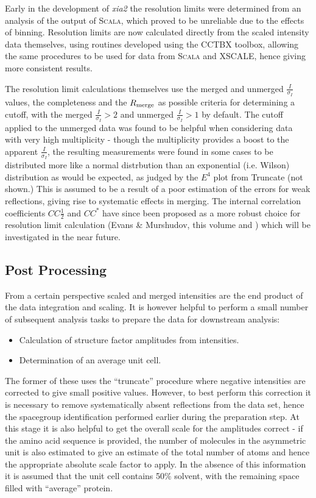 \documentclass[preprint,pdf]{iucr}
\begin{document}
Early in the development of \emph{xia2} the resolution limits were
determined from an analysis of the output of \textsc{Scala}, which proved to be
unreliable due to the effects of binning. 
Resolution limits are now calculated directly from the
scaled intensity data themselves, using routines developed using
the CCTBX toolbox, allowing the same procedures to be used for data
from \textsc{Scala} and XSCALE, hence giving more consistent results.

The resolution limit calculations themselves use the merged and
unmerged $\frac{I}{\sigma_I}$ values, the completeness and the
$R_{\rm{merge}}$ as possible criteria for determining a cutoff, with
the merged $\frac{I}{\sigma_I} > 2$ and unmerged 
$\frac{I}{\sigma_I}> 1$ by default. The cutoff applied to the unmerged
data was found to be 
helpful when considering data with very high multiplicity - though the
multiplicity provides a boost to the apparent $\frac{I}{\sigma_I}$,
the resulting measurements were found in some cases
to be distributed more like a
normal distrbution than an exponential (i.e. Wilson) distribution as
would be
expected, as judged by the $E^4$ plot from Truncate (not shown.)
This is assumed
to be a result of a poor estimation of the errors for weak
reflections, giving rise to systematic effects in
merging. The internal correlation coefficients $CC\frac{1}{2}$ and $CC^*$
have since been proposed as a more robust
choice for resolution limit calculation (Evans \& Murshudov, this
volume and \cite{Karplus25052012})
which will be investigated in the near future.

\subsection{Post Processing}

From a certain perspective scaled and merged intensities are the end
product of the data integration and scaling. It is however helpful to
perform a small number of subsequent analysis tasks to prepare the
data for downstream analysis:

\begin{itemize}
\item{Calculation of structure factor amplitudes from intensities.}
\item{Determination of an average unit cell.}
\end{itemize}

\noindent
The former of these uses the ``truncate'' procedure \cite{French:a15572}
where negative intensities are corrected to give small positive
values. However, to best perform this correction it is necessary to
remove systematically absent reflections from the data set, hence the
spacegroup identification performed earlier during the preparation
step. At this stage it is also helpful to get the overall scale for
the amplitudes correct - if the amino acid sequence is provided, the
number of molecules in the asymmetric unit is also
estimated \cite{KantardjieffRupp}
to give an estimate of the total number of atoms
and hence the appropriate absolute
scale factor to apply. In the absence of
this information it is assumed that the unit cell contains 50\%
solvent, with the remaining space filled with ``average'' protein. 
\end{document}
